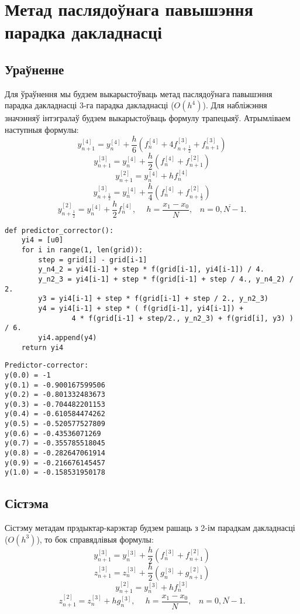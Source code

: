 \section{Метад паслядоўнага павышэння парадка дакладнасці}
\subsection*{Ураўненне}
Для ўраўнення мы будзем выкарыстоўваць метад паслядоўнага павышэння парадка дакладнасці 3-га парадка дакладнасці ($O(h^{4})$). Для набліжэння значэнняў інтэгралаў будзем выкарыстоўваць формулу трапецыяў. Атрымліваем наступныя формулы:
\[ y_{n+1}^{[4]} = y_n^{[4]} + \frac{h}{6}(f_n^{[4]} + 4f_{n+\frac{1}{2}}^{[3]} + f_{n+1}^{[3]}) \]
\[ y_{n+1}^{[3]} = y_n^{[4]} + \frac{h}{2}(f_n^{[4]} + f_{n+1}^{[2]}) \]
\[ y_{n+1}^{[2]} = y_n^{[4]} + hf_n^{[4]} \]
\[ y_{n+\frac{1}{2}}^{[3]} = y_n^{[4]} + \frac{h}{4}(f_n^{[4]} + f_{n+\frac{1}{2}}^{[2]}) \]
\[ y_{n+\frac{1}{2}}^{[2]} = y_n^{[4]} + \frac{h}{2}f_n^{[4]}, \hspace{15pt} h = \frac{x_1-x_0}{N}, \hspace{10pt} n = \overline{0, N-1}. \]

{\small
\begin{verbatim}
def predictor_corrector():
    yi4 = [u0]
    for i in range(1, len(grid)):
        step = grid[i] - grid[i-1]
        y_n4_2 = yi4[i-1] + step * f(grid[i-1], yi4[i-1]) / 4.
        y_n2_3 = yi4[i-1] + step * f(grid[i-1] + step / 4., y_n4_2) / 2.
        y3 = yi4[i-1] + step * f(grid[i-1] + step / 2., y_n2_3)
        y4 = yi4[i-1] + step * ( f(grid[i-1], yi4[i-1]) +
                4 * f(grid[i-1] + step/2., y_n2_3) + f(grid[i], y3) ) / 6.
        yi4.append(y4)
    return yi4
\end{verbatim}
}

{\small
\begin{verbatim}
Predictor-corrector:
y(0.0) = -1
y(0.1) = -0.900167599506
y(0.2) = -0.801332483673
y(0.3) = -0.704482201153
y(0.4) = -0.610584474262
y(0.5) = -0.520577527809
y(0.6) = -0.43536071269
y(0.7) = -0.355785518045
y(0.8) = -0.282647061914
y(0.9) = -0.216676145457
y(1.0) = -0.158531950178
\end{verbatim}
}

\subsection*{Сістэма}
Сістэму метадам прэдыктар-карэктар будзем рашаць з 2-ім парадкам дакладнасці ($O(h^{3})$), то бок справядлівыя формулы:
\[ y_{n+1}^{[3]} = y_n^{[3]} + \frac{h}{2}(f_n^{[3]} + f_{n+1}^{[2]}) \]
\[ z_{n+1}^{[3]} = z_n^{[3]} + \frac{h}{2}(g_n^{[3]} + g_{n+1}^{[2]}) \]
\[ y_{n+1}^{[2]} = y_n^{[3]} + hf_n^{[3]} \]
\[ z_{n+1}^{[2]} = z_n^{[3]} + hg_n^{[3]}, \hspace{15pt} h = \frac{x_1-x_0}{N}, \hspace{10pt} n = \overline{0, N-1}. \]

